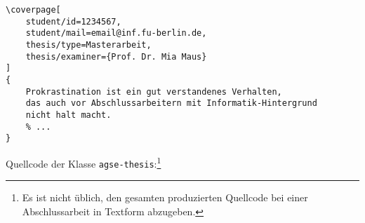 \begin{lstlisting}[language={[LaTeX]TeX}, morekeywords={coverpage}] 
\coverpage[
    student/id=1234567,
    student/mail=email@inf.fu-berlin.de,
    thesis/type=Masterarbeit,
    thesis/examiner={Prof. Dr. Mia Maus}
]
{
    Prokrastination ist ein gut verstandenes Verhalten,
    das auch vor Abschlussarbeitern mit Informatik-Hintergrund
    nicht halt macht.
    % ...
}
\end{lstlisting}

Quellcode der Klasse \texttt{agse-thesis}:\footnote{Es ist nicht üblich,
den gesamten produzierten Quellcode bei einer Abschlussarbeit in Textform
abzugeben.}

